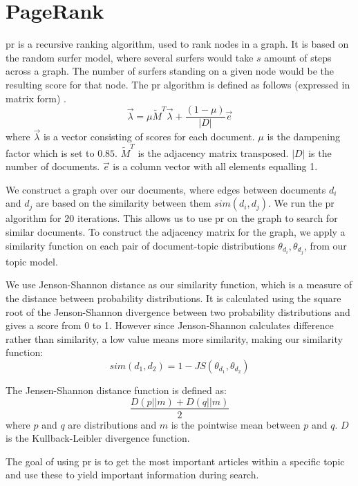 \section{PageRank}\label{sec:pagerank}
\gls{pr} is a recursive ranking algorithm, used to rank nodes in a graph.
It is based on the random surfer model, where several surfers would take $s$ amount of steps across a graph.
The number of surfers standing on a given node would be the resulting score for that node.
The \gls{pr} algorithm is defined as follows (expressed in matrix form) \cite{ClusterPageRank}.
$$ \overrightarrow{\lambda} = \mu \widetilde{M}^T \overrightarrow{\lambda} + \frac{(1-\mu)}{|D|} \overrightarrow{e} $$  
where $\overrightarrow{\lambda}$ is a vector consisting of scores for each document. 
$\mu$ is the dampening factor which is set to $0.85$.
$\widetilde{M}^T$ is the adjacency matrix transposed.
$|D|$ is the number of documents.
$\overrightarrow{e}$ is a column vector with all elements equalling 1.

We construct a graph over our documents, where edges between documents $d_i$ and $d_j$ are based on the similarity between them $sim(d_i, d_j)$.
We run the \gls{pr} algorithm for 20 iterations.
This allows us to use \gls{pr} on the graph to search for similar documents.
To construct the adjacency matrix for the graph, we apply a similarity function on each pair of document-topic distributions $\theta_{d_i}, \theta_{d_j}$, from our topic model.

We use Jenson-Shannon distance as our similarity function, which is a measure of the distance between probability distributions\cite{jensen-shannon2003}\cite{jensen-shannondis2003}.
It is calculated using the square root of the Jenson-Shannon divergence between two probability distributions and gives a score from 0 to 1.
However since Jenson-Shannon calculates difference rather than similarity, a low value means more similarity, making our similarity function:
$$sim(d_1, d_2) = 1 - JS(\theta_{d_1}, \theta_{d_2})$$

The Jensen-Shannon distance function is defined as:
$$ \frac{D(p || m) + D(q || m)}{2}$$
where $p$ and $q$ are distributions and $m$ is the pointwise mean between $p$ and $q$. 
$D$ is the Kullback-Leibler divergence function.

The goal of using \gls{pr} is to get the most important articles within a specific topic and use these to yield important information during search.  
